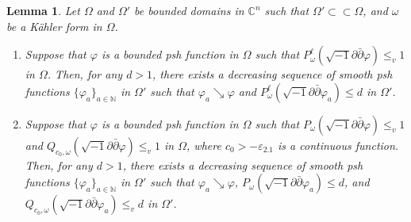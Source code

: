 \documentclass[10pt,a4paper]{amsart}
\numberwithin{equation}{section}
\newtheorem{lem}[equation]{Lemma}
\newcommand{\delb}{\sqrt{-1}\partial\bar{\partial}}
\begin{document}
\begin{lem}\label{lem:app}
    Let $\Omega$ and $\Omega'$ be bounded domains in $\mathbb{C}^n$ such that $\Omega'\subset\subset\Omega$, and $\omega$ be a Kähler form in $\Omega$. \begin{enumerate}[label={\upshape(\roman*)}]
        \item\label{item:appP} Suppose that $\varphi$ is a bounded psh function in $\Omega$ such that $P^\ell_{\omega}(\delb \varphi)\le_v1$ in $\Omega$. Then, for any $d>1$, there exists a decreasing sequence of smooth psh functions $\{\varphi_a\}_{a\in\mathbb{N}}$ in $\Omega'$ such that $\varphi_a\searrow\varphi$ and $P^\ell_\omega(\delb \varphi_a)\le d$ in $\Omega'$.
        \item\label{item:appQ} Suppose that $\varphi$ is a bounded psh function in $\Omega$ such that $P_{\omega}(\delb \varphi)\le_v1$ and $Q_{c_0,\omega}(\delb \varphi)\le_v1$ in $\Omega$, where $c_0>-\varepsilon_{2.1}$ is a continuous function. Then, for any $d>1$, there exists a decreasing sequence of smooth psh functions $\{\varphi_a\}_{a\in\mathbb{N}}$ in $\Omega'$ such that $\varphi_a\searrow\varphi$, $P_\omega(\delb \varphi_a)\le d$, and $Q_{c_0,\omega}(\delb \varphi_a)\le_v d$ in $\Omega'$.
    \end{enumerate}
\end{lem}
\end{document}
